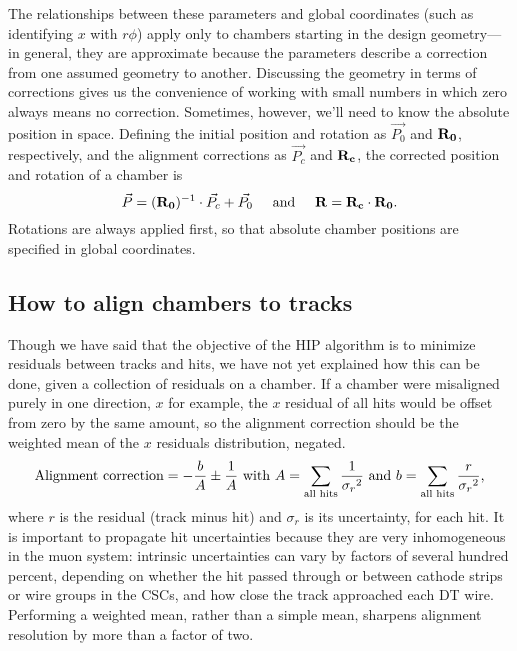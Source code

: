 \documentclass[12pt]{article}
\begin{document}
The relationships between these parameters and global coordinates
(such as identifying $x$ with $r\phi$) apply only to chambers starting
in the design geometry--- in general, they are approximate because the
parameters describe a correction from one assumed geometry to
another.  Discussing the geometry in terms of corrections gives us the
convenience of working with small numbers in which zero always means
no correction.  Sometimes, however, we'll need to know the absolute
position in space.  Defining the initial position and rotation as
$\vec{P_0}$ and ${\bf R_0}$, respectively, and the alignment corrections as
$\vec{P_c}$ and ${\bf R_c}$, the corrected position and rotation of a
chamber is
\begin{equation}
\vec{P} = ({\bf R_0})^{-1} \cdot \vec{P_c} + \vec{P_0}
\mbox{\hspace{0.5 cm}and\hspace{0.5 cm}} {\bf R} = {\bf R_c} \cdot {\bf R_0} \mbox{.}
\end{equation}
Rotations are always applied first, so that absolute chamber positions
are specified in global coordinates.

\subsection{How to align chambers to tracks}

Though we have said that the objective of the HIP algorithm is to
minimize residuals between tracks and hits, we have not yet explained
how this can be done, given a collection of residuals on a chamber.
If a chamber were misaligned purely in one direction, $x$ for example,
the $x$ residual of all hits would be offset from zero by the same
amount, so the alignment correction should be the weighted mean of the
$x$ residuals distribution, negated.
\begin{equation}
\mbox{Alignment correction} = -\frac{b}{A} \pm \frac{1}{A} \mbox{ with } A =
\sum_{\mbox{\scriptsize all hits}} \frac{1}{{\sigma_r}^2}
\mbox{ and } b = \sum_{\mbox{\scriptsize all hits}} \frac{r}{{\sigma_r}^2} \mbox{,}
\label{weighted_mean}
\end{equation}
where $r$ is the residual (track minus hit) and $\sigma_r$ is its
uncertainty, for each hit.  It is important to propagate hit
uncertainties because they are very inhomogeneous in the muon system:
intrinsic uncertainties can vary by factors of several hundred percent,
depending on whether the hit passed through or between cathode strips
or wire groups in the CSCs, and how close the track approached each DT
wire.  Performing a weighted mean, rather than a simple mean, sharpens
alignment resolution by more than a factor of two.
\end{document}
